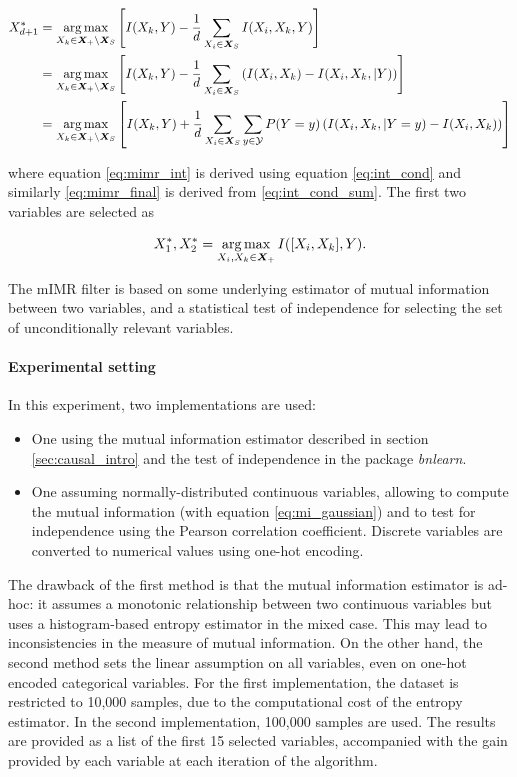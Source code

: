 \begin{align}
    X_{d+1}^* &= \operatorname*{arg\,max}_{X_k\in\bm X_+ \setminus \bm X_S}
    \left[I(X_k,Y) - \frac{1}{d}\sum_{X_i\in\bm X_S} I(X_i, X_k, Y)\right]\\
    &= \operatorname*{arg\,max}_{X_k\in\bm X_+ \setminus \bm X_S}
    \left[I(X_k,Y) - \frac{1}{d}\sum_{X_i\in\bm X_S}
    \left(I(X_i,X_k)-I(X_i, X_k,|Y)\right)\right]\label{eq:mimr_int}\\
    &= \operatorname*{arg\,max}_{X_k\in\bm X_+ \setminus \bm X_S}
    \left[I(X_k,Y) + \frac{1}{d}\sum_{X_i\in\bm X_S} \sum_{y\in\mathcal Y}
    P(Y = y)\left(I(X_i, X_k,|Y=y)-I(X_i,X_k)\right)\right]\label{eq:mimr_final}
\end{align}

where equation \ref{eq:mimr_int} is derived using equation \ref{eq:int_cond} and
similarly \ref{eq:mimr_final} is derived from \ref{eq:int_cond_sum}. The first two variables are selected as

\begin{equation}
    X_1^*, X_2^* = \operatorname*{arg\,max}_{X_i, X_k\in\bm X_+}I([X_i,X_k],Y).
\end{equation}

The mIMR filter is based on some underlying estimator of mutual information
between two variables, and a statistical test of independence for selecting the
set of unconditionally relevant variables.

\paragraph{Experimental setting} In this experiment, two implementations are
used:
\noprelistbreak
\begin{itemize}
    \item One using the mutual information estimator described in section
    \ref{sec:causal_intro} and the test of independence in the package
    \emph{bnlearn}.
    \item One assuming normally-distributed continuous variables, allowing to
    compute the mutual information (with equation \ref{eq:mi_gaussian}) and to
    test for independence using the Pearson correlation coefficient. Discrete
    variables are converted to numerical values using one-hot encoding.
\end{itemize}

The drawback of the first method is that the mutual information estimator is
ad-hoc: it assumes a monotonic relationship between two continuous variables
but uses a histogram-based entropy estimator in the mixed case. This may lead to
inconsistencies in the measure of mutual information. On the other hand, the
second method sets the linear assumption on all variables, even on one-hot
encoded categorical variables. For the first implementation, the dataset is
restricted to 10,000 samples, due to the computational cost of the entropy
estimator. In the second implementation, 100,000 samples are used. The results
are provided as a list of the first 15 selected variables, accompanied with the
gain provided by each variable at each iteration of the algorithm.

